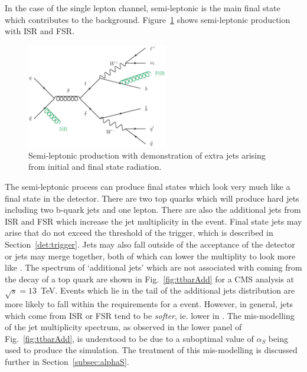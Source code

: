 In the case of the single lepton channel, semi-leptonic \ttbar is the main final state which contributes to the background. Figure~\ref{fig:ttbarback} shows semi-leptonic \ttbar production with ISR and FSR.

\begin{figure}[ht!]
\begin{center}
    \includegraphics[width=0.55\textwidth]{images/Theory/ttbarISRFSR3.eps}
    \caption{Semi-leptonic \ttbar production with demonstration of extra jets arising from initial and final state radiation.}
    \label{fig:ttbarback}
\end{center}
\end{figure}

The semi-leptonic \ttbar process can produce final states which look very much like a \tttt final state in the detector. There are two top quarks which will produce hard jets including two b-quark jets and one lepton. There are also the additional jets from ISR and FSR which increase the jet multiplicity in the event. Final state jets may arise that do not exceed the \pt threshold of the trigger, which is described in Section~\ref{det:trigger}. Jets may also fall outside of the acceptance of the detector or jets may merge together, both of which can lower the \tttt multiplity to look more like \ttbar. 
The spectrum of `additional jets' which are not associated with coming from the decay of a top quark are shown in Fig.~\ref{fig:ttbarAdd} for a CMS analysis at $\sqrt{s}=13$~TeV. Events which lie in the tail of the additional jets distribution are more likely to fall within the requirements for a \tttt event. However, in general, jets which come from ISR or FSR tend to be \emph{softer}, ie. lower in \pt. The mis-modelling of the jet multiplicity spectrum, as observed in the lower panel of Fig.~\ref{fig:ttbarAdd}, is understood to be due to a suboptimal value of $\alpha_S$ being used to produce the \ttbar simulation. The treatment of this mis-modelling is discussed further in Section~\ref{subsec:alphaS}.

